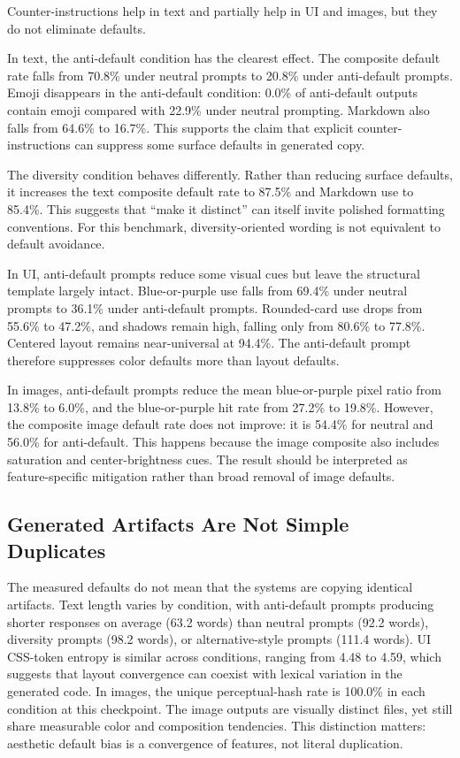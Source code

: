 \documentclass[10pt]{article}
\begin{document}
Counter-instructions help in text and partially help in UI and images, but they do not eliminate defaults.

In text, the anti-default condition has the clearest effect. The composite default rate falls from 70.8\% under neutral prompts to 20.8\% under anti-default prompts. Emoji disappears in the anti-default condition: 0.0\% of anti-default outputs contain emoji compared with 22.9\% under neutral prompting. Markdown also falls from 64.6\% to 16.7\%. This supports the claim that explicit counter-instructions can suppress some surface defaults in generated copy.

The diversity condition behaves differently. Rather than reducing surface defaults, it increases the text composite default rate to 87.5\% and Markdown use to 85.4\%. This suggests that ``make it distinct'' can itself invite polished formatting conventions. For this benchmark, diversity-oriented wording is not equivalent to default avoidance.

In UI, anti-default prompts reduce some visual cues but leave the structural template largely intact. Blue-or-purple use falls from 69.4\% under neutral prompts to 36.1\% under anti-default prompts. Rounded-card use drops from 55.6\% to 47.2\%, and shadows remain high, falling only from 80.6\% to 77.8\%. Centered layout remains near-universal at 94.4\%. The anti-default prompt therefore suppresses color defaults more than layout defaults.

In images, anti-default prompts reduce the mean blue-or-purple pixel ratio from 13.8\% to 6.0\%, and the blue-or-purple hit rate from 27.2\% to 19.8\%. However, the composite image default rate does not improve: it is 54.4\% for neutral and 56.0\% for anti-default. This happens because the image composite also includes saturation and center-brightness cues. The result should be interpreted as feature-specific mitigation rather than broad removal of image defaults.

\subsection{Generated Artifacts Are Not Simple Duplicates}

The measured defaults do not mean that the systems are copying identical artifacts. Text length varies by condition, with anti-default prompts producing shorter responses on average (63.2 words) than neutral prompts (92.2 words), diversity prompts (98.2 words), or alternative-style prompts (111.4 words). UI CSS-token entropy is similar across conditions, ranging from 4.48 to 4.59, which suggests that layout convergence can coexist with lexical variation in the generated code. In images, the unique perceptual-hash rate is 100.0\% in each condition at this checkpoint. The image outputs are visually distinct files, yet still share measurable color and composition tendencies. This distinction matters: aesthetic default bias is a convergence of features, not literal duplication.
\end{document}
